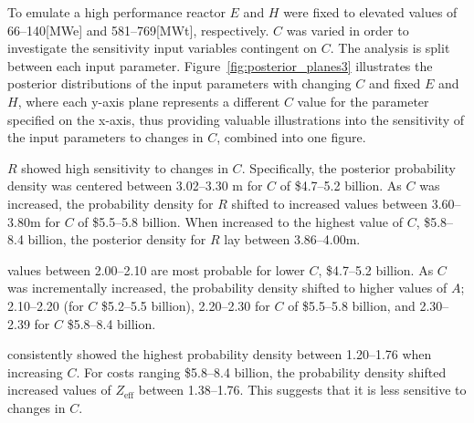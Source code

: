\documentclass[journal]{IEEEtran}
\begin{document}




To emulate a high performance reactor $E$ and $H$ were fixed to elevated values of 66--140[MWe] and 581--769[MWt], respectively. $C$ was varied in order to investigate the sensitivity input variables contingent on $C$. The analysis is split between each input parameter. Figure~\ref{fig:posterior_planes3} illustrates the posterior distributions of the input parameters with changing $C$ and fixed $E$ and $H$, where each y-axis plane represents a different $C$ value for the parameter specified on the x-axis, thus providing valuable illustrations into the sensitivity of the input parameters to changes in $C$, combined into one figure. 

\textbf{$R$} showed high sensitivity to changes in $C$. Specifically, the posterior probability density was centered between 3.02--3.30 m for $C$ of \$4.7--5.2 billion. As $C$ was increased, the probability density for $R$ shifted to increased values between 3.60--3.80m for $C$ of \$5.5--5.8 billion. When increased to the highest value of $C$, \$5.8--8.4 billion, the posterior density for $R$ lay between 3.86--4.00m. 

 values between 2.00--2.10 are most probable for lower $C$, \$4.7--5.2 billion. As $C$ was incrementally increased, the probability density shifted to higher values of $A$; 2.10--2.20 (for $C$ \$5.2--5.5 billion), 2.20--2.30 for $C$ of \$5.5--5.8 billion, and 2.30--2.39 for $C$ \$5.8--8.4 billion.  

 consistently showed the highest probability density between 1.20--1.76 when increasing $C$. For costs ranging \$5.8--8.4 billion, the probability density shifted increased values of $Z_{\text{eff}}$ between 1.38--1.76. This suggests that it is less sensitive to changes in $C$.
\end{document}
